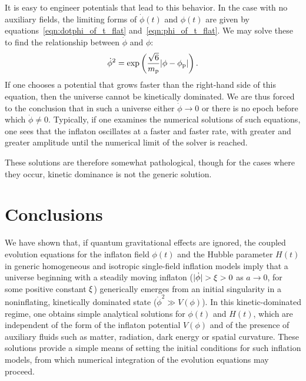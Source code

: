It is easy to engineer potentials that lead to this behavior. In the case with no auxiliary fields, the limiting forms of $\dot{\phi}(t)$ and $\phi(t)$ are given by equations~\eqref{eqn:dotphi_of_t_flat} and~\eqref{eqn:phi_of_t_flat}. We may solve these to find the relationship between $\dot{\phi}$ and $\phi$:
%
\begin{equation}
  \dot{\phi}^2 = \exp\left(\frac{\sqrt{6}}{m_{\mathrm{p}}} |\phi-\phi_{\mathrm{p}}|\right).
\end{equation}
%
If one chooses a potential that grows faster than the right-hand side of this equation, then the universe cannot be kinetically dominated.  We are thus forced to the conclusion that in such a universe either $\dot{\phi}\to 0$ or there is no epoch before which $\dot{\phi}\ne 0$.  Typically, if one examines the numerical solutions of such equations, one sees that the inflaton oscillates at a faster and faster rate, with greater and greater amplitude until the numerical limit of the solver is reached.

These solutions are therefore somewhat pathological, though for the cases where they occur, kinetic dominance is not the generic solution.









\section{Conclusions}
\label{sec:Conclusions}

We have shown that, if quantum gravitational effects are ignored, the coupled evolution equations for the inflaton field $\phi(t)$ and the Hubble parameter $H(t)$ in generic homogeneous and isotropic single-field inflation models imply that a universe beginning with a steadily moving inflaton ($|\dot{\phi}| > \xi > 0$ as $a\to 0$, for some positive constant $\xi$) generically emerges from an initial singularity in a noninflating, kinetically dominated state ($\dot{\phi}^2 \gg V(\phi)$).  In this kinetic-dominated regime, one obtains simple analytical solutions for $\phi(t)$ and $H(t)$, which are independent of the form of the inflaton potential $V(\phi)$ and of the presence of auxiliary fluids such as matter, radiation, dark energy or spatial curvature. These solutions provide a simple means of setting the initial conditions for such inflation models, from which numerical integration of the evolution equations may proceed.

